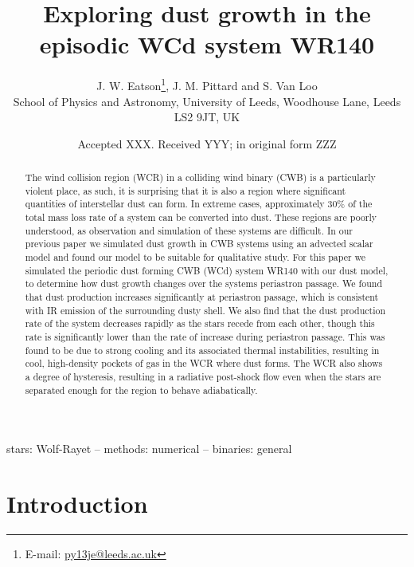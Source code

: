 \documentclass[fleqn,usenatbib]{mnras}
\title[Dust growth simulations of WR140]{Exploring dust growth in the episodic WCd system WR140}
\author[J. W. Eatson, J. M. Pittard \& S. Van Loo]{
J. W. Eatson\thanks{E-mail: \href{mailto:py13je@leeds.ac.uk}{py13je@leeds.ac.uk}},
J. M. Pittard
and
S. Van Loo
\\
School of Physics and Astronomy, University of
       Leeds, Woodhouse Lane, Leeds LS2 9JT, UK\\  
}
\date{Accepted XXX. Received YYY; in original form ZZZ}
\begin{document}
\label{firstpage}
\pagerange{\pageref{firstpage}--\pageref{lastpage}}
\maketitle

\begin{abstract}
  \noindent
  The wind collision region (WCR) in a colliding wind binary (CWB) is a particularly violent place, as such, it is surprising that it is also a region where significant quantities of interstellar dust can form.
  In extreme cases, approximately 30\% of the total mass loss rate of a system can be converted into dust.
  These regions are poorly understood, as observation and simulation of these systems are difficult.
  In our previous paper we simulated dust growth in CWB systems using an advected scalar model and found our model to be suitable for qualitative study.
  For this paper we simulated the periodic dust forming CWB (WCd) system WR140 with our dust model, to determine how dust growth changes over the systems periastron passage.
  We found that dust production increases significantly at periastron passage, which is consistent with IR emission of the surrounding dusty shell.
  We also find that the dust production rate of the system decreases rapidly as the stars recede from each other, though this rate is significantly lower than the rate of increase during periastron passage.
  This was found to be due to strong cooling and its associated thermal instabilities, resulting in cool, high-density pockets of gas in the WCR where dust forms.
  The WCR also shows a degree of hysteresis, resulting in a radiative post-shock flow even when the stars are separated enough for the region to behave adiabatically.
\end{abstract}

\begin{keywords}
stars: Wolf-Rayet -- methods: numerical -- binaries: general
\end{keywords}



\section{Introduction}
\end{document}
